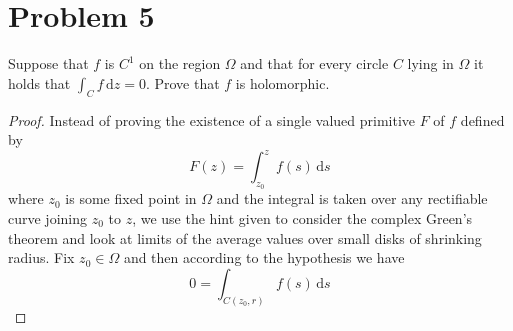 \documentclass{article}[12pt]
\def\D{\mathrm{d}}
\begin{document}
\section*{Problem 5} Suppose that $f$ is $C^1$ on the region $\Omega$ and
that for every circle $C$ lying in $\Omega$ it holds that $\int_C f\,\D z=0$.
Prove that $f$ is holomorphic.
\begin{proof}
Instead of proving the existence of a single valued primitive $F$ of $f$ defined
by 
\[
F(z) = \int_{z_0}^z f(s)\,\D s
\]
where $z_0$ is some fixed point in $\Omega$ and the integral is taken over
any rectifiable curve joining $z_0$ to $z$,
we use the hint given to consider
the complex Green's theorem and look at limits of 
the average values over small disks of shrinking radius. 
Fix $z_0\in \Omega$ and then
according to the hypothesis we have
\[
0 = \int_{C(z_0,r)} f(s)\,\D s
\]


\end{proof}
\end{document}
